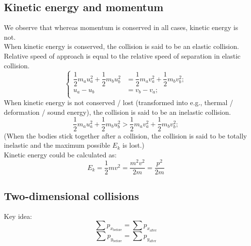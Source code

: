 \documentclass[a4paper,12pt]{article}
\begin{document}
\subsection{Kinetic energy and momentum}
We observe that whereas momentum is conserved in all cases, kinetic energy is not.\\
When kinetic energy is conserved, the collision is said to be an elastic collision. Relative speed of approach is equal to the relative speed of separation in elastic collision.
\[\left\{
\begin{aligned}
\dfrac{1}{2}m_au_a^2+\dfrac{1}{2}m_bu_b^2&=\dfrac{1}{2}m_av_a^2+\dfrac{1}{2}m_bv_b^2;\\
u_a-u_b&=v_b-v_a;\\
\end{aligned}\right. \]
When kinetic energy is not conserved / lost (transformed into e.g., thermal / deformation / sound energy), the collision is said to be an inelastic collision.
\[\dfrac{1}{2}m_au_a^2+\dfrac{1}{2}m_bu_b^2>\dfrac{1}{2}m_av_a^2+\dfrac{1}{2}m_bv_b^2;\]
(When the bodies stick together after a collision, the collision is said to be totally inelastic and the maximum possible $E_k$ is lost.)\\
Kinetic energy could be calculated as:
\[E_k=\dfrac{1}{2}mv^2=\dfrac{m^2v^2}{2m}=\dfrac{p^2}{2m}\]
\subsection{Two-dimensional collisions}
\begin{center}
\end{center}
Key idea:
\[\sum p_{x_\text{before}}=\sum p_{x_\text{after}}\]
\[\sum p_{y_\text{before}}=\sum p_{y_\text{after}}\]
\end{document}
